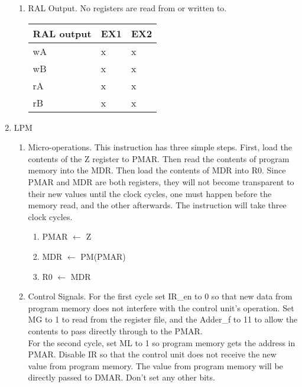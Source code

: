 \documentclass[12pt,letterpaper]{article}
\begin{document}
\begin{enumerate}
\begin{enumerate}
        \item RAL Output. No registers are read from or written to.\\
            \begin{tabular}{l l l}
                 RAL output & EX1 & EX2 \\
                 \hline
                 wA & x & x \\
                 wB & x & x \\
                 rA & x & x \\
                 rB & x & x \\
            \end{tabular}
    \end{enumerate}



    \item LPM
    \begin{enumerate}
        \item Micro-operations. This instruction has three simple steps. First, load the contents of the Z register to PMAR. Then read the contents of program memory into the MDR. Then load the contents of MDR into R0. Since PMAR and MDR are both registers, they will not become transparent to their new values until the clock cycles, one must happen before the memory read, and the other afterwards. The instruction will take three clock cycles.\\
            \begin{enumerate}[i]
                \item PMAR $\leftarrow$ Z
                \item MDR $\leftarrow$ PM(PMAR)
                \item R0 $\leftarrow$ MDR
            \end{enumerate}
        \item Control Signals. For the first cycle set IR\_en to 0 so that new data from program memory does not interfere with the control unit's operation. Set MG to 1 to read from the register file, and the Adder\_f to 11 to allow the contents to pass directly through to the PMAR.\\
        For the second cycle, set ML to 1 so program memory gets the address in PMAR. Disable IR so that the control unit does not receive the new value from program memory. The value from program memory will be directly passed to DMAR. Don't set any other bits.\\

\end{enumerate}
\end{enumerate}
\end{document}
